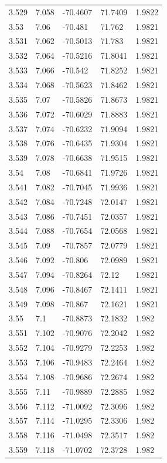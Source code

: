 \begin{tabular}{lllll}
3.529 & 7.058 & -70.4607 & 71.7409 & 1.9822 \\
3.53 & 7.06 & -70.481 & 71.762 & 1.9821 \\
3.531 & 7.062 & -70.5013 & 71.783 & 1.9821 \\
3.532 & 7.064 & -70.5216 & 71.8041 & 1.9821 \\
3.533 & 7.066 & -70.542 & 71.8252 & 1.9821 \\
3.534 & 7.068 & -70.5623 & 71.8462 & 1.9821 \\
3.535 & 7.07 & -70.5826 & 71.8673 & 1.9821 \\
3.536 & 7.072 & -70.6029 & 71.8883 & 1.9821 \\
3.537 & 7.074 & -70.6232 & 71.9094 & 1.9821 \\
3.538 & 7.076 & -70.6435 & 71.9304 & 1.9821 \\
3.539 & 7.078 & -70.6638 & 71.9515 & 1.9821 \\
3.54 & 7.08 & -70.6841 & 71.9726 & 1.9821 \\
3.541 & 7.082 & -70.7045 & 71.9936 & 1.9821 \\
3.542 & 7.084 & -70.7248 & 72.0147 & 1.9821 \\
3.543 & 7.086 & -70.7451 & 72.0357 & 1.9821 \\
3.544 & 7.088 & -70.7654 & 72.0568 & 1.9821 \\
3.545 & 7.09 & -70.7857 & 72.0779 & 1.9821 \\
3.546 & 7.092 & -70.806 & 72.0989 & 1.9821 \\
3.547 & 7.094 & -70.8264 & 72.12 & 1.9821 \\
3.548 & 7.096 & -70.8467 & 72.1411 & 1.9821 \\
3.549 & 7.098 & -70.867 & 72.1621 & 1.9821 \\
3.55 & 7.1 & -70.8873 & 72.1832 & 1.982 \\
3.551 & 7.102 & -70.9076 & 72.2042 & 1.982 \\
3.552 & 7.104 & -70.9279 & 72.2253 & 1.982 \\
3.553 & 7.106 & -70.9483 & 72.2464 & 1.982 \\
3.554 & 7.108 & -70.9686 & 72.2674 & 1.982 \\
3.555 & 7.11 & -70.9889 & 72.2885 & 1.982 \\
3.556 & 7.112 & -71.0092 & 72.3096 & 1.982 \\
3.557 & 7.114 & -71.0295 & 72.3306 & 1.982 \\
3.558 & 7.116 & -71.0498 & 72.3517 & 1.982 \\
3.559 & 7.118 & -71.0702 & 72.3728 & 1.982 \\

\end{tabular}
